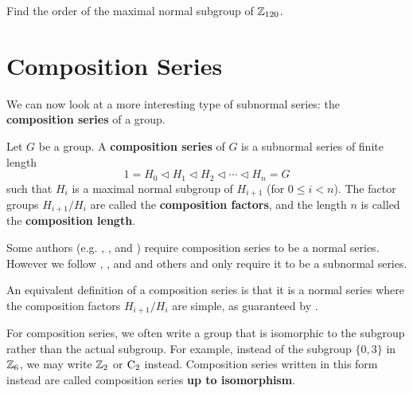 \begin{exercise}
    Find the order of the maximal normal subgroup of $\mathbb{Z}_{120}$.
\end{exercise}

\section{Composition Series}
We can now look at a more interesting type of subnormal series: the \textbf{composition series} of a group.
\begin{definition}
    Let $G$ be a group. A \textbf{composition series} of $G$ is a subnormal series of finite length
    \[
        1 = H_0 \lhd H_1 \lhd H_2 \lhd \cdots \lhd H_n = G  
    \]
    such that $H_i$ is a maximal normal subgroup of $H_{i+1}$ (for $0 \leq i < n$). The factor groups $H_{i+1}/H_i$ are called the \textbf{composition factors}, and the length $n$ is called the \textbf{composition length}.
\end{definition}
\begin{remark}
    Some authors (e.g. {\cite[p.~257]{cohn_1982}}, \cite{proofwiki_composition-series-definition}, and {\cite[\S 73]{clark_1984}}) require composition series to be a normal series. However we follow {\cite[Definition II.8.3]{hungerford_1980}}, {\cite[Definition 15.12]{humphreys_1996}}, and {\cite[p.~85]{milne_2021}} and others and only require it to be a subnormal series.
\end{remark}
\begin{remark}
    An equivalent definition of a composition series is that it is a normal series where the composition factors $H_{i+1}/H_i$ are simple, as guaranteed by .
\end{remark}

For composition series, we often write a group that is isomorphic to the subgroup rather than the actual subgroup. For example, instead of the subgroup $\{0, 3\}$ in $\mathbb{Z}_6$, we may write $\mathbb{Z}_2$ or $\mathrm{C}_{2}$ instead. Composition series written in this form instead are called composition series \textbf{up to isomorphism}.

